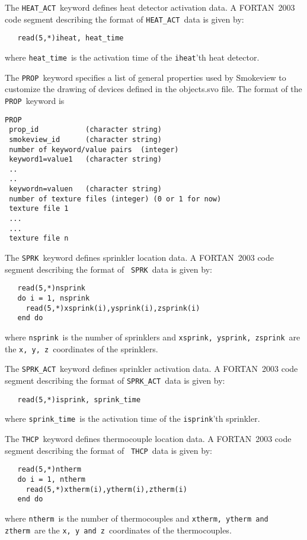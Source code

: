 \documentclass[11pt,twoside]{book}
\begin{document}
{The {\tt HEAT\_ACT}\ keyword defines heat detector
activation data. A FORTAN~2003 code segment describing the format
of {\tt HEAT\_ACT}\ data is given by:
\begin{lstlisting}
   read(5,*)iheat, heat_time
\end{lstlisting}
where {\tt heat\_time}\ is the activation time of the {\tt iheat}'th heat
detector.

The {\tt PROP}\ keyword specifies
a list of general properties used
by Smokeview to customize the drawing of devices defined in
the objects.svo file.
The format of the {\tt PROP}\ keyword is

\begin{lstlisting}
PROP
 prop_id           (character string)
 smokeview_id      (character string)
 number of keyword/value pairs  (integer)
 keyword1=value1   (character string)
 ..
 ..
 keywordn=valuen   (character string)
 number of texture files (integer) (0 or 1 for now)
 texture file 1
 ...
 ...
 texture file n
\end{lstlisting}

The {\tt SPRK}\ keyword defines sprinkler location
data. A FORTAN~2003 code segment describing the format of {\tt
SPRK}\ data is given by:
\begin{lstlisting}
   read(5,*)nsprink
   do i = 1, nsprink
     read(5,*)xsprink(i),ysprink(i),zsprink(i)
   end do
\end{lstlisting}
where {\tt nsprink}\ is the number of sprinklers and
{\tt xsprink, ysprink, zsprink}\ are the {\tt x, y, z}\
coordinates of the sprinklers.

The {\tt SPRK\_ACT}\ keyword defines sprinkler
activation data. A FORTAN~2003 code segment describing the format
of {\tt SPRK\_ACT}\ data is given by:
\begin{lstlisting}
   read(5,*)isprink, sprink_time
\end{lstlisting}
where {\tt sprink\_time}\ is the activation time of the {\tt isprink}'th sprinkler.

The {\tt THCP}\ keyword defines thermocouple location
data. A FORTAN~2003 code segment describing the format of {\tt
THCP}\ data is given by:
\begin{lstlisting}
   read(5,*)ntherm
   do i = 1, ntherm
     read(5,*)xtherm(i),ytherm(i),ztherm(i)
   end do
\end{lstlisting}
where {\tt ntherm}\ is the number of thermocouples and
{\tt xtherm, ytherm and ztherm}\ are the {\tt x, y and z}\
coordinates of the thermocouples.

}
\end{document}
